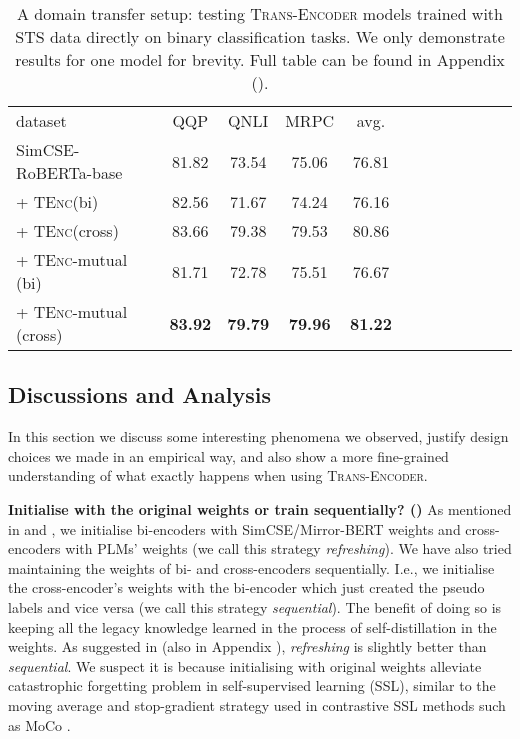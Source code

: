 \documentclass{article} \usepackage{iclr2021_conference,times}
\newcommand{\modelname}{\textsc{Trans-Encoder}\xspace}
\newcommand{\tenc}{\textsc{TEnc}\xspace}
\begin{document}
\begin{table}[!t] \centering
\begin{tabular}{lccccccccccc}
\cmidrule[1.5pt]{1-10}
 dataset  & QQP & QNLI & MRPC & avg.\\
\cmidrule[1.0pt]{1-10}
  SimCSE-RoBERTa-base & 81.82 & 73.54 & 75.06 & 76.81  \\
 + \tenc (bi) & 82.56 & 71.67 & 74.24 & 76.16 \\
   + \tenc (cross) & 83.66 & 79.38 & 79.53 & 80.86 \\
    \rowcolor{blue!5}
  + \tenc-mutual (bi) & 81.71 & 72.78 & 75.51 & 76.67 \\
    \rowcolor{blue!5}
 + \tenc-mutual (cross) & \textbf{83.92} & \textbf{79.79} & \textbf{79.96} & \textbf{81.22} \\
  \cmidrule[1.5pt]{1-10}
\end{tabular}
\vspace{-1mm}
\caption{A domain transfer setup: testing \modelname models trained with STS data directly on binary classification tasks. We only demonstrate results for one model for brevity. Full table can be found in Appendix ().}
\label{tab:binary_transfer}
\vspace{-2.0mm}
\end{table}



\subsection{Discussions and Analysis}\label{sec:discuss_and_analysis}

In this section we discuss some interesting phenomena we observed, justify design choices we made in an empirical way, and also show a more fine-grained understanding of what exactly happens when using \modelname. 

\textbf{Initialise with the original weights or train sequentially? ()} As mentioned in  and , we initialise bi-encoders with SimCSE/Mirror-BERT weights and cross-encoders with PLMs' weights (we call this strategy \textit{refreshing}). We have also tried maintaining the weights of bi- and cross-encoders sequentially. I.e., we initialise the cross-encoder's weights with the bi-encoder which just created the pseudo labels and vice versa (we call this strategy \textit{sequential}). The benefit of doing so is keeping all the legacy knowledge learned in the process of self-distillation in the weights. As suggested in  (also in Appendix ), \textit{refreshing} is slightly better than \textit{sequential}. We suspect it is because initialising with original weights alleviate catastrophic forgetting problem in self-supervised learning (SSL), similar to the moving average and stop-gradient strategy used in contrastive SSL methods such as MoCo \citep{he2020momentum}.
\end{document}
